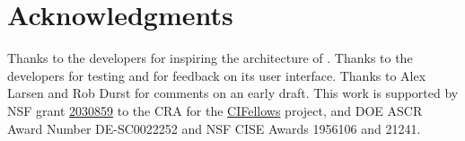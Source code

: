 \documentclass{juliacon}
\begin{document}
\section{Acknowledgments}

Thanks to the \Sherlogs{} developers for inspiring the architecture of \TF{}.
Thanks to the \RxInfer{} developers for testing \TF{} and for feedback on its user interface.
Thanks to Alex Larsen and Rob Durst for comments on an early draft.
This work is supported by
NSF grant \href{https://nsf.gov/awardsearch/showAward?AWD_ID=2030859&HistoricalAwards=false}{2030859}
to the CRA for the \href{https://cifellows2020.org}{CIFellows} project,
and DOE ASCR Award Number DE-SC0022252 and NSF CISE Awards 1956106 and 21241.


\end{document}
